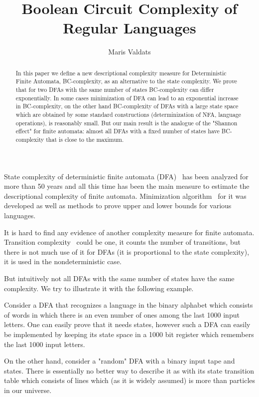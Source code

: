 \documentclass[copyright, creativecommons]{eptcs}
\title{Boolean Circuit Complexity of Regular Languages}
\author{Maris Valdats
\institute{University of Latvia\\
Faculty of Computing\\
Riga, Rai\c{n}a Bulv. 19, Latvia\\}
\email{d20416@lanet.lv}}
\begin{document}
\maketitle

\begin{abstract}
In this paper we define a new descriptional complexity measure for
Deterministic Finite Automata, BC-complexity, as an alternative to the state complexity.
We prove that for two DFAs with the same number of states BC-complexity can differ exponentially.
In some cases minimization of DFA can lead to an exponential increase in BC-complexity,
on the other hand BC-complexity of DFAs
with a large state space which are obtained by some standard constructions (determinization of NFA, language operations),
is reasonably small.
But our main result is the analogue of the "Shannon effect" for finite automata:
almost all DFAs with a fixed number of states have BC-complexity that is close to the maximum.
\end{abstract}
\label{1nod}
 State complexity of deterministic finite automata (DFA)~\cite{B70}\cite{H79} has been analyzed for more than
50 years and all this time has been
the main measure to estimate the descriptional complexity of finite automata. Minimization algorithm~\cite{H71}
for it was developed as well as methods to prove upper and lower bounds for various languages.

It is hard to
find any evidence of another complexity measure for finite automata.
Transition complexity~\cite{G05} could be one, it counts the number
of transitions, but there is not much use of it for DFAs (it is proportional to the state complexity),
it is used in the nondeterministic case.

But intuitively not all DFAs with the same number of states have the same complexity.
We try to illustrate it with the following example.

Consider a DFA that recognizes a language in the binary alphabet
which consists of words in which there is an even number of ones
among the last 1000 input letters. One can easily prove that it needs  states,
however such a DFA can easily be implemented by keeping its
state space in a 1000 bit register which remembers the last 1000 input letters.

On the other hand, consider a "random" DFA with a binary input tape and  states. There is essentially no better way
to describe it as with its state transition table which consists of  lines which (as it is widely
assumed) is more than particles in our universe.
\end{document}

